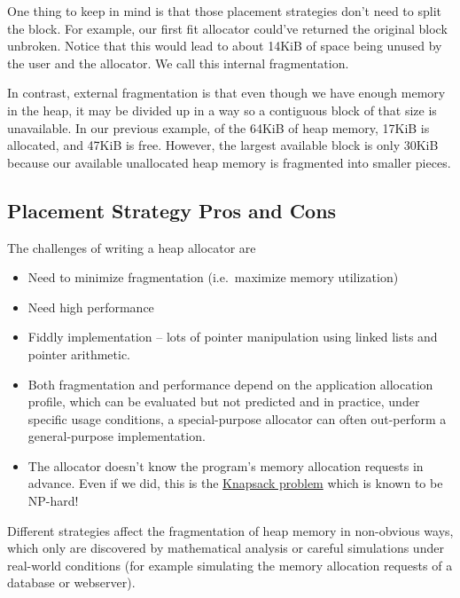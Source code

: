 One thing to keep in mind is that those placement strategies don't need to split the block.
For example, our first fit allocator could've returned the original block unbroken.
Notice that this would lead to about 14KiB of space being unused by the user and the allocator.
We call this internal fragmentation.

In contrast, external fragmentation is that even though we have enough memory in the heap, it may be divided up in a way so a contiguous block of that size is unavailable.
In our previous example, of the 64KiB of heap memory, 17KiB is allocated, and 47KiB is free.
However, the largest available block is only 30KiB because our available unallocated heap memory is fragmented into smaller pieces.

\subsection{Placement Strategy Pros and Cons}

The challenges of writing a heap allocator are
\begin{itemize}
\item Need to minimize fragmentation (i.e.~maximize memory utilization)
\item Need high performance
\item Fiddly implementation -- lots of pointer manipulation using linked lists and pointer arithmetic.
\item Both fragmentation and performance depend on the application allocation profile, which can be evaluated but not predicted and in practice, under specific usage conditions, a special-purpose allocator can often out-perform a general-purpose implementation.
\item The allocator doesn't know the program's memory allocation requests in advance. Even if we did, this is the \href{http://en.wikipedia.org/wiki/Knapsack_problem}{Knapsack problem} which is known to be NP-hard!
\end{itemize}

Different strategies affect the fragmentation of heap memory in non-obvious ways, which only are discovered by mathematical analysis or careful simulations under real-world conditions (for example simulating the memory allocation requests of a database or webserver).

